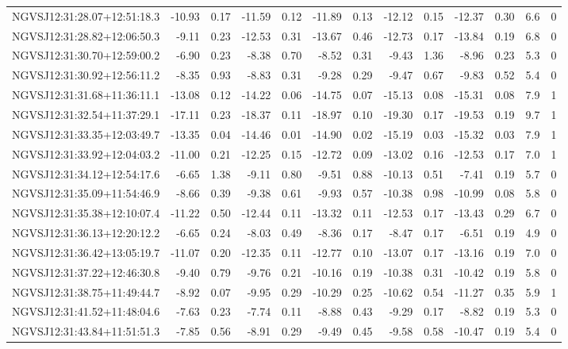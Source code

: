 \begin{tabular}{lrrrrrrrrrrcc}
NGVSJ12:31:28.07+12:51:18.3 & -10.93 & 0.17 & -11.59 & 0.12 & -11.89 & 0.13 & -12.12 & 0.15 & -12.37 & 0.30 & 6.6 & 0 \\
NGVSJ12:31:28.82+12:06:50.3 & -9.11 & 0.23 & -12.53 & 0.31 & -13.67 & 0.46 & -12.73 & 0.17 & -13.84 & 0.19 & 6.8 & 0 \\
NGVSJ12:31:30.70+12:59:00.2 & -6.90 & 0.23 & -8.38 & 0.70 & -8.52 & 0.31 & -9.43 & 1.36 & -8.96 & 0.23 & 5.3 & 0 \\
NGVSJ12:31:30.92+12:56:11.2 & -8.35 & 0.93 & -8.83 & 0.31 & -9.28 & 0.29 & -9.47 & 0.67 & -9.83 & 0.52 & 5.4 & 0 \\
NGVSJ12:31:31.68+11:36:11.1 & -13.08 & 0.12 & -14.22 & 0.06 & -14.75 & 0.07 & -15.13 & 0.08 & -15.31 & 0.08 & 7.9 & 1 \\
NGVSJ12:31:32.54+11:37:29.1 & -17.11 & 0.23 & -18.37 & 0.11 & -18.97 & 0.10 & -19.30 & 0.17 & -19.53 & 0.19 & 9.7 & 1 \\
NGVSJ12:31:33.35+12:03:49.7 & -13.35 & 0.04 & -14.46 & 0.01 & -14.90 & 0.02 & -15.19 & 0.03 & -15.32 & 0.03 & 7.9 & 1 \\
NGVSJ12:31:33.92+12:04:03.2 & -11.00 & 0.21 & -12.25 & 0.15 & -12.72 & 0.09 & -13.02 & 0.16 & -12.53 & 0.17 & 7.0 & 1 \\
NGVSJ12:31:34.12+12:54:17.6 & -6.65 & 1.38 & -9.11 & 0.80 & -9.51 & 0.88 & -10.13 & 0.51 & -7.41 & 0.19 & 5.7 & 0 \\
NGVSJ12:31:35.09+11:54:46.9 & -8.66 & 0.39 & -9.38 & 0.61 & -9.93 & 0.57 & -10.38 & 0.98 & -10.99 & 0.08 & 5.8 & 0 \\
NGVSJ12:31:35.38+12:10:07.4 & -11.22 & 0.50 & -12.44 & 0.11 & -13.32 & 0.11 & -12.53 & 0.17 & -13.43 & 0.29 & 6.7 & 0 \\
NGVSJ12:31:36.13+12:20:12.2 & -6.65 & 0.24 & -8.03 & 0.49 & -8.36 & 0.17 & -8.47 & 0.17 & -6.51 & 0.19 & 4.9 & 0 \\
NGVSJ12:31:36.42+13:05:19.7 & -11.07 & 0.20 & -12.35 & 0.11 & -12.77 & 0.10 & -13.07 & 0.17 & -13.16 & 0.19 & 7.0 & 0 \\
NGVSJ12:31:37.22+12:46:30.8 & -9.40 & 0.79 & -9.76 & 0.21 & -10.16 & 0.19 & -10.38 & 0.31 & -10.42 & 0.19 & 5.8 & 0 \\
NGVSJ12:31:38.75+11:49:44.7 & -8.92 & 0.07 & -9.95 & 0.29 & -10.29 & 0.25 & -10.62 & 0.54 & -11.27 & 0.35 & 5.9 & 1 \\
NGVSJ12:31:41.52+11:48:04.6 & -7.63 & 0.23 & -7.74 & 0.11 & -8.88 & 0.43 & -9.29 & 0.17 & -8.82 & 0.19 & 5.3 & 0 \\
NGVSJ12:31:43.84+11:51:51.3 & -7.85 & 0.56 & -8.91 & 0.29 & -9.49 & 0.45 & -9.58 & 0.58 & -10.47 & 0.19 & 5.4 & 0 \\

\end{tabular}
